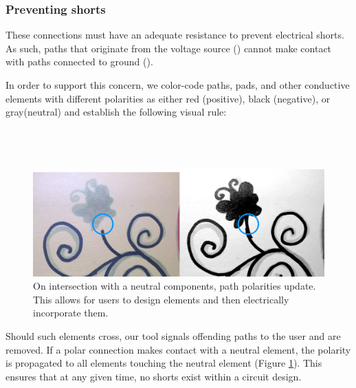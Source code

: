 \documentclass{sigchi}
\begin{document}
    \subsubsection{Preventing shorts}
    These connections must have an adequate resistance to prevent electrical shorts. As such, paths that originate from the voltage source () cannot make contact with paths connected to ground ().

    In order to support this concern, we color-code paths, pads, and other conductive elements with different polarities as either red (positive), black (negative), or gray(neutral) and establish the following visual rule:
    \\
    \\
    \noindent{}
    \\
    \\
\begin{figure}[h]
\centering
\includegraphics[width=1.0\columnwidth]{figures/propagation.pdf}
\caption{On intersection with a neutral components, path polarities update. This allows for users to design elements and then electrically incorporate them. }
\label{fig:propagation}
\end{figure}
    Should such elements cross, our tool signals offending paths to the user and are removed. If a polar connection makes contact with a neutral element, the polarity is propagated to all elements touching the neutral element (Figure \ref{fig:propagation}). This ensures that at any given time, no shorts exist within a circuit design.



    \noindent{}
    
\end{document}
